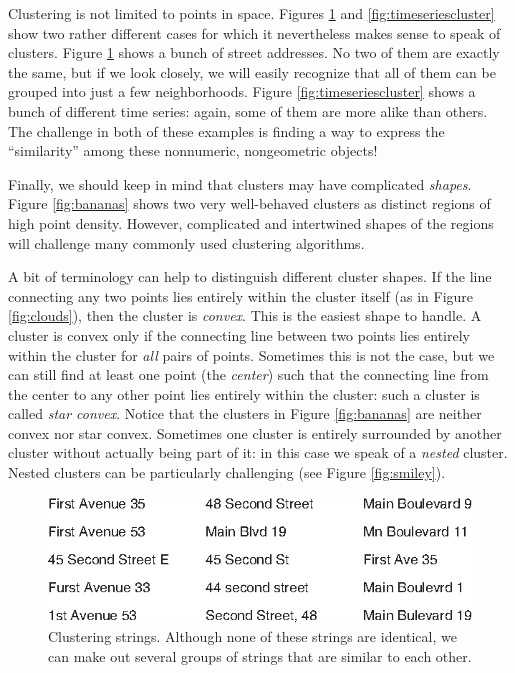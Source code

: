 Clustering is not limited to points in space. Figures
\ref{fig:stringscluster} and \ref{fig:timeseriescluster} show two
rather different cases for which it nevertheless makes sense to speak
of clusters. Figure \ref{fig:stringscluster} shows a bunch of street
addresses.  No two of them are exactly the same, but if we look
closely, we will easily recognize that all of them can be grouped into
just a few neighborhoods. Figure \ref{fig:timeseriescluster} shows a
bunch of different time series: again, some of them are more alike
than others.  The challenge in both of these examples is finding
a way to express the ``similarity'' among these nonnumeric,
nongeometric objects!


Finally, we should keep in mind that clusters may have complicated
\emph{shapes}. Figure \ref{fig:bananas} shows two very well-behaved
clusters as distinct regions of high point density. However,
complicated and intertwined shapes of the regions will challenge many
commonly used clustering algorithms.

A bit of terminology can help to distinguish different cluster shapes.
If the line connecting any two points lies entirely within the cluster
itself (as in Figure \ref{fig:clouds}), then the cluster is
\emph{convex}.  This is the easiest shape to handle.  A cluster is
convex only if the connecting line between two points lies entirely
within the cluster for \emph{all} pairs of points.  Sometimes this is
not the case, but we can still find at least one point (the
\emph{center}) such that the connecting line from the center to any
other point\vadjust{\pagebreak} lies entirely within the cluster: such a cluster is called
\emph{star convex}.  Notice that the clusters in Figure
\ref{fig:bananas} are neither convex nor star convex. Sometimes one
cluster is entirely surrounded by another cluster without actually
being part of it: in this case we speak of a \emph{nested} cluster.  
Nested clusters can be particularly challenging (see Figure
\ref{fig:smiley}).


\begin{figure}
  \centerline{\includegraphics{img/strings}}
  \caption{Clustering strings. Although none of these strings are identical, 
we can make out several groups of strings that are similar to each
other.}
  \label{fig:stringscluster}
\end{figure}

